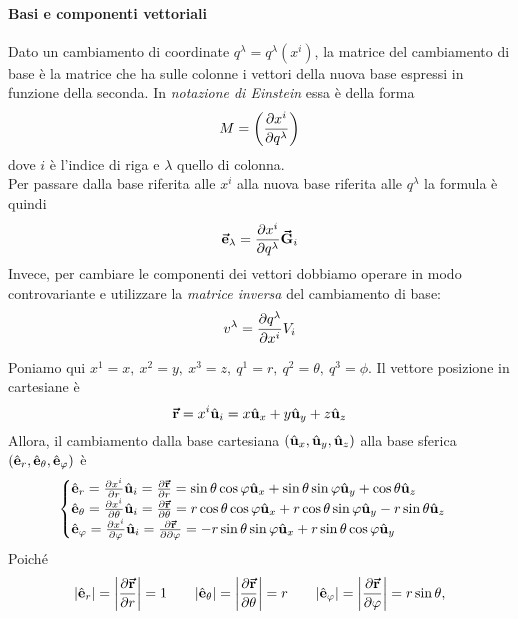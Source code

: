 \paragraph{Basi e componenti vettoriali}
\begin{remember}
	Dato un cambiamento di coordinate $q^\lambda=q^\lambda(x^i)$, la matrice del cambiamento di base è la matrice che ha sulle colonne i vettori della nuova base espressi in funzione della seconda.
	In \textit{notazione di Einstein} essa è della forma
	\begin{equation}
		M=\left(\pdv{x^i}{q^\lambda}\right)
	\end{equation}
	dove $i$ è l'indice di riga e $\lambda$ quello di colonna.\\
	Per passare dalla base riferita alle $x^i$ alla nuova base riferita alle $q^\lambda$ la formula è quindi
	\begin{equation}
		\vb*{\va{e}}_\lambda=\pdv{x^i}{q^\lambda}\vb*{\va{G}}_i
	\end{equation}
	Invece, per cambiare le componenti dei vettori dobbiamo operare in modo controvariante e utilizzare la \textit{matrice inversa} del cambiamento di base:
	\begin{equation}
		v^\lambda=\pdv{q^\lambda}{x^i}V_i
	\end{equation}
\end{remember}
\noindent Poniamo qui $x^1=x,\ x^2=y,\ x^3=z,\ q^1=r,\ q^2=\theta,\ q^3=\phi$.
Il vettore posizione in cartesiane è
\begin{equation*}
	\vb*{\va{r}}=x^i\hat{\mathbf{u}}_i=x\hat{\mathbf{u}}_x+y\hat{\mathbf{u}}_y+z\hat{\mathbf{u}}_z
\end{equation*}
Allora, il cambiamento dalla base cartesiana $\left(\hat{\mathbf{u}}_x,\hat{\mathbf{u}}_y,\hat{\mathbf{u}}_z\right)$ alla base sferica $\left(\hat{\mathbf{e}}_r,\hat{\mathbf{e}}_\theta,\hat{\mathbf{e}}_\varphi\right)$ è
\begin{equation}
	\begin{cases}
		\hat{\mathbf{e}}_r=\pdv{x^i}{r}\hat{\mathbf{u}}_i=\pdv{\vb*{\va{r}}}{r}=\sin\theta\cos\varphi\hat{\mathbf{u}}_x+\sin\theta\sin\varphi\hat{\mathbf{u}}_y+\cos\theta\hat{\mathbf{u}}_z\\
		\hat{\mathbf{e}}_\theta=\pdv{x^i}{\theta}\hat{\mathbf{u}}_i=\pdv{\vb*{\va{r}}}{\theta}=r\cos\theta\cos\varphi\hat{\mathbf{u}}_x+r\cos\theta\sin\varphi\hat{\mathbf{u}}_y-r\sin\theta\hat{\mathbf{u}}_z\\
		\hat{\mathbf{e}}_\varphi=\pdv{x^i}{\varphi}\hat{\mathbf{u}}_i=\pdv{\vb*{\va{r}}}{\partial \varphi}=-r\sin\theta\sin\varphi\hat{\mathbf{u}}_x+r\sin\theta\cos\varphi\hat{\mathbf{u}}_y
	\end{cases}
\end{equation}
Poiché
\begin{equation}
	\abs{\hat{\mathbf{e}}_r}=\abs{\pdv{\vb*{\va{r}}}{r}}=1\qquad\abs{\hat{\mathbf{e}}_\theta}=\abs{\pdv{\vb*{\va{r}}}{\theta}}=r\qquad\abs{\hat{\mathbf{e}}_\varphi}=\abs{\pdv{\vb*{\va{r}}}{\varphi}}=r\sin\theta,
\end{equation}

